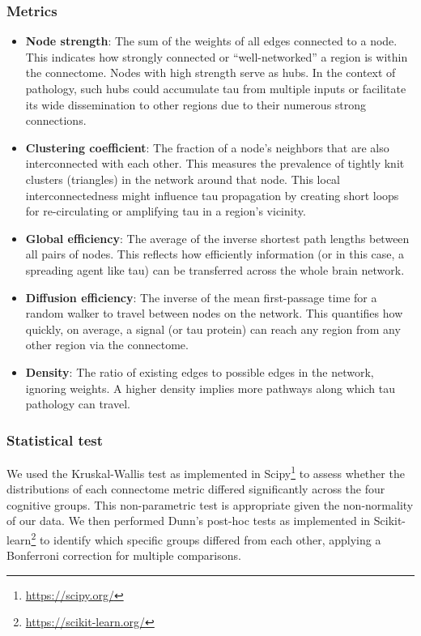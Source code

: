 \subsubsection{Metrics}\label{section:connectome_metrics}
\begin{itemize}
    \item \textbf{Node strength}: The sum of the weights of all edges connected to a node. This indicates how strongly connected or “well-networked” a region is within the connectome. Nodes with high strength serve as hubs. In the context of pathology, such hubs could accumulate tau from multiple inputs or facilitate its wide dissemination to other regions due to their numerous strong connections.
    \item \textbf{Clustering coefficient}: The fraction of a node’s neighbors that are also interconnected with each other. This measures the prevalence of tightly knit clusters (triangles) in the network around that node. This local interconnectedness might influence tau propagation by creating short loops for re-circulating or amplifying tau in a region’s vicinity.
    \item \textbf{Global efficiency}: The average of the inverse shortest path lengths between all pairs of nodes. This reflects how efficiently information (or in this case, a spreading agent like tau) can be transferred across the whole brain network.
    \item \textbf{Diffusion efficiency}: The inverse of the mean first-passage time for a random walker to travel between nodes on the network. This quantifies how quickly, on average, a signal (or tau protein) can reach any region from any other region via the connectome.
    \item \textbf{Density}: The ratio of existing edges to possible edges in the network, ignoring weights. A higher density implies more pathways along which tau pathology can travel.
\end{itemize}

\subsubsection{Statistical test}\label{section:statistical_tests}
We used the Kruskal-Wallis test as implemented in Scipy\footnote{\url{https://scipy.org/}} to assess whether the distributions of each connectome metric differed significantly across the four cognitive groups. This non-parametric test is appropriate given the non-normality of our data. We then performed Dunn's post-hoc tests as implemented in Scikit-learn\footnote{\url{https://scikit-learn.org/}} to identify which specific groups differed from each other, applying a Bonferroni correction for multiple comparisons.

